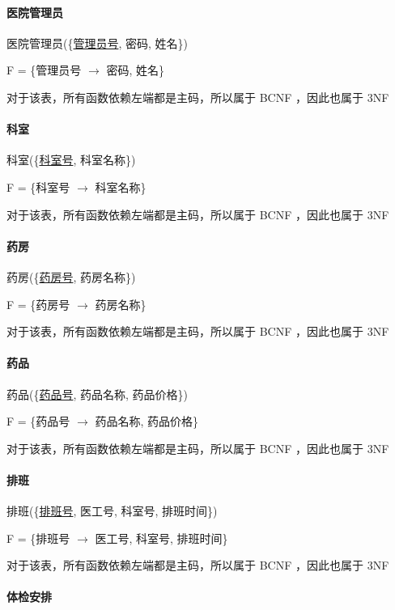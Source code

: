 \documentclass{article}
\begin{document}
\paragraph{医院管理员}

医院管理员(\{\underline{管理员号}, 密码, 姓名\})

F = \{管理员号 $\rightarrow$ 密码, 姓名\}

对于该表，所有函数依赖左端都是主码，所以属于 BCNF ，因此也属于 3NF

\paragraph{科室}

科室(\{\underline{科室号}, 科室名称\})

F = \{科室号 $\rightarrow$ 科室名称\}

对于该表，所有函数依赖左端都是主码，所以属于 BCNF ，因此也属于 3NF

\paragraph{药房}

药房(\{\underline{药房号}, 药房名称\})

F = \{药房号 $\rightarrow$ 药房名称\}

对于该表，所有函数依赖左端都是主码，所以属于 BCNF ，因此也属于 3NF

\paragraph{药品}

药品(\{\underline{药品号}, 药品名称, 药品价格\})

F = \{药品号 $\rightarrow$ 药品名称, 药品价格\}

对于该表，所有函数依赖左端都是主码，所以属于 BCNF ，因此也属于 3NF

\paragraph{排班}

排班(\{\underline{排班号}, 医工号, 科室号, 排班时间\})

F = \{排班号 $\rightarrow$ 医工号, 科室号, 排班时间\}

对于该表，所有函数依赖左端都是主码，所以属于 BCNF ，因此也属于 3NF

\paragraph{体检安排}
\end{document}
